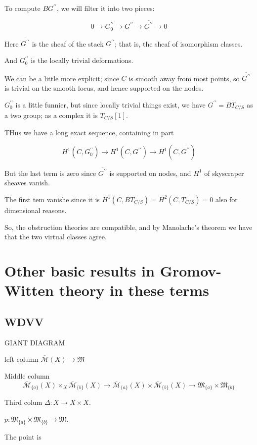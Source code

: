 \documentclass{amsart}
\theoremstyle{definition}
\newcommand{\Mbar}{\overline{\mathcal{M}}}
\begin{document}
To compute $BG^{\prime\prime}$, we will filter it into two pieces:

$$0\to G^{\prime\prime}_0\to G^{\prime\prime}\to \overline{G^{\prime\prime}}\to0$$

Here $\overline{G^{\prime\prime}}$ is the sheaf of the stack $G^{\prime\prime}$; that is, the sheaf of isomorphism classes.

And $G^{\prime\prime}_0$ is the locally trivial deformations.  

We can be a little more explicit; since $C$ is smooth away from most points, so $\overline{G^{\prime\prime}}$ is trivial on the smooth locus, and hence supported on the nodes.

$G^{\prime\prime}_0$ is a little funnier, but since locally trivial things exist, we have $G^{\prime\prime}=BT_{C/S}$ as a two group; as a complex it is $T_{C/S}[1]$.

THus we have a long exact sequence, containing in part

$$H^1(C, G^{\prime\prime}_0)\to H^1(C,G^{\prime\prime})\to H^1(C, \overline{G^{\prime\prime}})$$

But the last term is zero since $\overline{G^{\prime\prime}}$ is supported on nodes, and $H^1$ of skyscraper sheaves vanish.

The first tem vanishe since it is $H^1(C, BT_{C/S})=H^2(C, T_{C/S})=0$ also for dimensional reasons.  

So, the obstruction theories are compatible, and by Manolache's theorem we have that the two virtual classes agree.

\section{Other basic results in Gromov-Witten theory in these terms}

\subsection{WDVV} 
GIANT DIAGRAM

left column $\Mbar(X)\to \mathfrak{M}$ 

Middle column $$\Mbar_{\{a\}}(X)\times_X\Mbar_{\{b\}}(X)\to \Mbar_{\{a\}}(X)\times\Mbar_{\{b\}}(X)\to \mathfrak{M}_{\{a\}}\times\mathfrak{M}_{\{b\}}$$

Third colum $\Delta:X\to X\times X$.

$p:\mathfrak{M}_{\{a\}}\times\mathfrak{M}_{\{b\}}\to\mathfrak{M}$.

The point is
\end{document}
